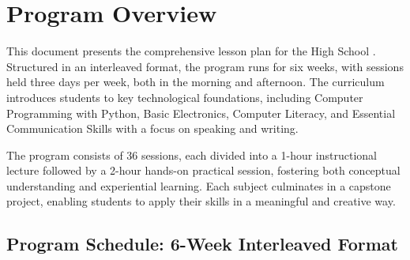 

\title{} %
\author{} %
\date{}   %




\clearpage %
\tableofcontents %
\thispagestyle{plain} %

\clearpage %

\section*{Program Overview}

This document presents the comprehensive lesson plan for the High School \programname. Structured in an interleaved format, the program runs for six weeks, with sessions held three days per week, both in the morning and afternoon. The curriculum introduces students to key technological foundations, including Computer Programming with Python, Basic Electronics, Computer Literacy, and Essential Communication Skills with a focus on speaking and writing.

The program consists of 36 sessions, each divided into a 1-hour instructional lecture followed by a 2-hour hands-on practical session, fostering both conceptual understanding and experiential learning. Each subject culminates in a capstone project, enabling students to apply their skills in a meaningful and creative way.

\subsection*{Program Schedule: 6-Week Interleaved Format}

\vspace{0.5cm}

